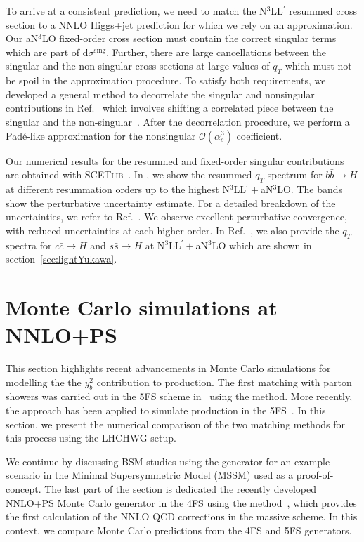 \documentclass[11pt,a4paper]{article}
\begin{document}
To arrive at a consistent prediction, we need to match the N$^3$LL$^{\prime}$ resummed cross section to a NNLO Higgs+jet prediction for which we rely on an approximation. 
Our aN$^3$LO fixed-order cross section must contain the correct singular terms which are part of $\mathrm{d} \sigma^\mathrm{sing}$.
Further, there are large cancellations between the singular and the non-singular cross sections at large values of $q_T$ which must not be spoil in the approximation procedure.
To satisfy both requirements,
we developed a general method to decorrelate the singular and nonsingular contributions in Ref.~\cite{Cal:2023mib} which involves shifting a correlated piece between the singular and the non-singular~\cite{Dehnadi:2022prz}.
After the decorrelation procedure, we perform a Pad\'e-like approximation for the nonsingular $\mathcal{O}\left(\alpha_s^3\right)$ coefficient. 

Our numerical results for the
resummed and fixed-order singular contributions are obtained with
\textsc{SCETlib}~\cite{scetlib}.
In , we show the resummed $q_T$ spectrum for $b\bar{b}\to H$ at different resummation orders up to the highest N$^3$LL$^{\prime}+$aN$^3$LO. The bands show the perturbative uncertainty estimate. For a detailed breakdown of the uncertainties, we refer to Ref.~\cite{Cal:2023mib}. We observe excellent perturbative convergence, with reduced uncertainties at each higher order. In Ref.~\cite{Cal:2023mib}, we also provide the $q_T$ spectra for $c\bar{c}\to H$ and $s\bar{s}\to H$ at N$^3$LL$^{\prime}+$aN$^3$LO which are shown in section~\ref{sec:lightYukawa}.

\section{Monte Carlo simulations at NNLO+PS}\label{sec:MCyb}
This section highlights recent advancements in Monte Carlo simulations for modelling the the $y_b^2$ contribution to \bbH{} production. The first matching with parton showers was carried out in the 5FS scheme in~ using the \minnlo{} method. More recently, the \GENEVA{} approach has been applied to 
simulate \bbtoH{} production in the 5FS~\cite{Gavardi:2025zpf}. In this section, we present the numerical comparison of the two matching 
methods for this process using the LHCHWG setup.

We continue by discussing BSM studies using the \minnlo{} generator for an example scenario in the Minimal Supersymmetric Model (MSSM) used as a proof-of-concept. 
The last part of the section is dedicated the recently developed NNLO+PS Monte Carlo generator in the 4FS using the \minnlo{} method~\cite{Biello:2024pgo}, 
which provides the first calculation of the NNLO QCD corrections in the massive scheme. In this context, we compare Monte Carlo predictions from the 
4FS and 5FS \minnlo{} generators.
\end{document}
